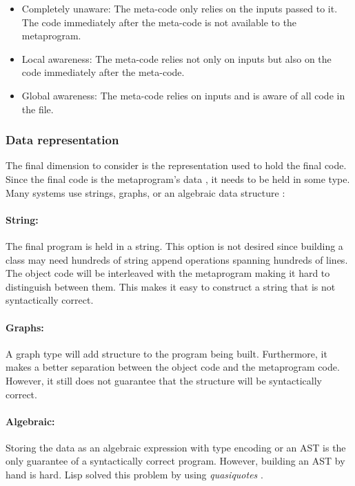 \begin{itemize}
	\item Completely unaware: The meta-code only relies on the inputs passed to it.
	      The code immediately after the meta-code is not available to the metaprogram.
	\item Local awareness: The meta-code relies not only on inputs but also on the code immediately after the meta-code.
	\item Global awareness: The meta-code relies on inputs and is aware of all code in the file.
\end{itemize}

\subsubsection{Data representation}
The final dimension to consider is the representation used to hold the final code.
Since the final code is the metaprogram's data \cite{bawden_99_01}, it needs to be held in some type.
Many systems use strings, graphs, or an algebraic data structure \cite{sheard_01_01}:

\paragraph{String:}
The final program is held in a string.
This option is not desired since building a class may need hundreds of string append operations spanning hundreds of lines.
The object code will be interleaved with the metaprogram making it hard to distinguish between them.
This makes it easy to construct a string that is not syntactically correct.

\paragraph{Graphs:}
A graph type will add structure to the program being built.
Furthermore, it makes a better separation between the object code and the metaprogram code.
However, it still does not guarantee that the structure will be syntactically correct.

\paragraph{Algebraic:}
Storing the data as an algebraic expression with type encoding or an AST is the only guarantee of a syntactically correct program.
However, building an AST by hand is hard.
Lisp solved this problem by using \textit{quasiquotes} \cite{bawden_99_01}.

